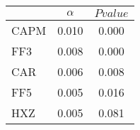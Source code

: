 \begin{tabular}{lcc}
\toprule
 & $\alpha$ & $Pvalue$ \\
\midrule
CAPM & 0.010 & 0.000 \\
FF3 & 0.008 & 0.000 \\
CAR & 0.006 & 0.008 \\
FF5 & 0.005 & 0.016 \\
HXZ & 0.005 & 0.081 \\
\bottomrule
\end{tabular}
